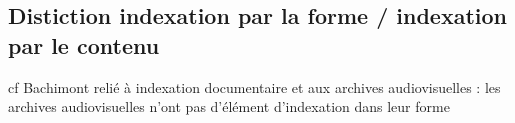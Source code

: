 \subsection{Distiction indexation par la forme / indexation par le contenu}

cf Bachimont 
relié à indexation documentaire et aux archives audiovisuelles : les archives audiovisuelles n'ont pas d'élément d'indexation dans leur forme 
